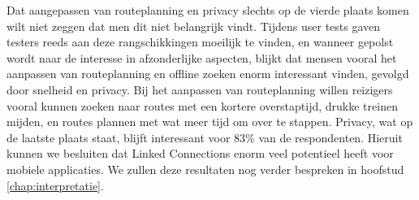 Dat aangepassen van routeplanning en privacy slechts op de vierde plaats komen wilt niet zeggen dat men dit niet belangrijk vindt. Tijdens user tests gaven testers reeds aan deze rangschikkingen moeilijk te vinden, en wanneer gepolst wordt naar de interesse in afzonderlijke aspecten, blijkt dat mensen vooral het aanpassen van routeplanning en offline zoeken enorm interessant vinden, gevolgd door snelheid en privacy. Bij het aanpassen van routeplanning willen reizigers vooral kunnen zoeken naar routes met een kortere overstaptijd, drukke treinen mijden, en routes plannen met wat meer tijd om over te stappen. Privacy, wat op de laatste plaats staat, blijft interessant voor 83\% van de respondenten. Hieruit kunnen we besluiten dat Linked Connections enorm veel potentieel heeft voor mobiele applicaties. We zullen deze resultaten nog verder bespreken in hoofstud \ref{chap:interpretatie}.
